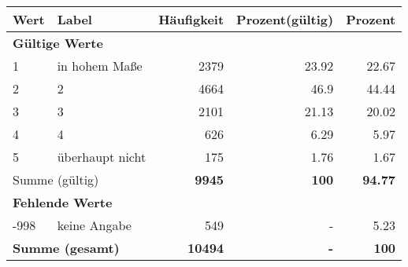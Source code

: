      \begin{longtable}{lXrrr}
     \toprule
     \textbf{Wert} & \textbf{Label} & \textbf{Häufigkeit} & \textbf{Prozent(gültig)} & \textbf{Prozent} \\
     \endhead
     \midrule
     \multicolumn{5}{l}{\textbf{Gültige Werte}}\\

     1 &
     \multicolumn{1}{X}{ in hohem Maße   } &


       \num{2379} &
       \num[round-mode=places,round-precision=2]{23,92} &
         \num[round-mode=places,round-precision=2]{22,67} \\

     2 &
     \multicolumn{1}{X}{ 2   } &


       \num{4664} &
       \num[round-mode=places,round-precision=2]{46,9} &
         \num[round-mode=places,round-precision=2]{44,44} \\

     3 &
     \multicolumn{1}{X}{ 3   } &


       \num{2101} &
       \num[round-mode=places,round-precision=2]{21,13} &
         \num[round-mode=places,round-precision=2]{20,02} \\

     4 &
     \multicolumn{1}{X}{ 4   } &


       \num{626} &
       \num[round-mode=places,round-precision=2]{6,29} &
         \num[round-mode=places,round-precision=2]{5,97} \\

     5 &
     \multicolumn{1}{X}{ überhaupt nicht   } &


       \num{175} &
       \num[round-mode=places,round-precision=2]{1,76} &
         \num[round-mode=places,round-precision=2]{1,67} \\
     \midrule
     \multicolumn{2}{l}{Summe (gültig)} &
       \textbf{\num{9945}} &
     \textbf{100} &
       \textbf{\num[round-mode=places,round-precision=2]{94,77}} \\
     \multicolumn{5}{l}{\textbf{Fehlende Werte}}\\
       -998 &
       keine Angabe &
         \num{549} &
        - &
         \num[round-mode=places,round-precision=2]{5,23} \\
     \midrule
     \multicolumn{2}{l}{\textbf{Summe (gesamt)}} &
          \textbf{\num{10494}} &
        \textbf{-} &
        \textbf{100} \\
     \bottomrule
     \end{longtable}
     
